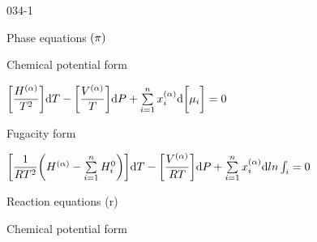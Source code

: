 \begin{mitframe}{034-1}
\begin{listone}
    \item Phase equations $(\pie)$
    
    \begin{listtwo}

    	\item Chemical potential form

      	\begin{listthree}
            
            \item $\bigg[\dfrac{\enthalpy^{(\tdiff)}}{\Temp^2}\bigg]\mathrm{d}\Temp-\bigg[\dfrac{\vol^{(\tdiff)}}{\Temp}\bigg]\mathrm{d}\p+\sum\limits^{n}_{i=1}\specfrac{i}^{(\tdiff)}\mathrm{d}\bigg[\chempot_{i}\bigg]=0$          
 

		\end{listthree}
        
        \item Fugacity form

      	\begin{listthree}
            
            \item $\bigg[\dfrac{1}{\gasconst\Temp^2}\bigg(\enthalpy^{(\tdiff)}-\sum\limits_{i=1}^{n}\enthalpy_i^0\bigg)\bigg]\mathrm{d}\Temp-\bigg[\dfrac{\vol^{(\tdiff)}}{\gasconst\Temp}\bigg]\mathrm{d}\p+\sum\limits_{i=1}^{n}\specfrac{i}^{(\tdiff)}\mathrm{d}ln\int_{i}=0$          



		\end{listthree}
    
    \end{listtwo}
    
    \item Reaction equations (r)
    
    \begin{listtwo}

    	\item Chemical potential form


\end{listtwo}
\end{listone}
\end{mitframe}
